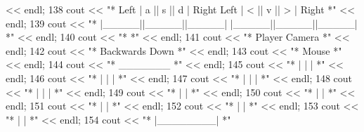 \begin{DoxyCode}
      << endl;
138         cout << \textcolor{stringliteral}{"*   Left  |  a  ||  s  ||  d  |  Right          Left   |  <  ||  v  ||  >  |  Right    *"} 
      << endl;
139         cout << \textcolor{stringliteral}{"*         |\_\_\_\_\_||\_\_\_\_\_||\_\_\_\_\_|                        |\_\_\_\_\_||\_\_\_\_\_||\_\_\_\_\_|           *"} 
      << endl;
140         cout << \textcolor{stringliteral}{"*                                                                                      *"} 
      << endl;
141         cout << \textcolor{stringliteral}{"*                 Player                                       Camera                  *"} 
      << endl;
142         cout << \textcolor{stringliteral}{"*                Backwards                                      Down                   *"} 
      << endl;
143         cout << \textcolor{stringliteral}{"*                                      Mouse                                           *"} 
      << endl;
144         cout << \textcolor{stringliteral}{"*                                     \_\_\_\_\_\_\_                                          *"} 
      << endl;
145         cout << \textcolor{stringliteral}{"*                                    |    |   |                                        *"} 
      << endl;
146         cout << \textcolor{stringliteral}{"*                                   |     |    |                                       *"} 
      << endl;
147         cout << \textcolor{stringliteral}{"*                                  |      |     |                                      *"} 
      << endl;
148         cout << \textcolor{stringliteral}{"*                                  |      |     |                                      *"} 
      << endl;
149         cout << \textcolor{stringliteral}{"*                                 |              |                                     *"} 
      << endl;
150         cout << \textcolor{stringliteral}{"*                                 |              |                                     *"} 
      << endl;
151         cout << \textcolor{stringliteral}{"*                                 |              |                                     *"} 
      << endl;
152         cout << \textcolor{stringliteral}{"*                                  |            |                                      *"} 
      << endl;
153         cout << \textcolor{stringliteral}{"*                                   |          |                                       *"} 
      << endl;
154         cout << \textcolor{stringliteral}{"*                                    |\_\_\_\_\_\_\_\_|                                        *"} 

\end{DoxyCode}

